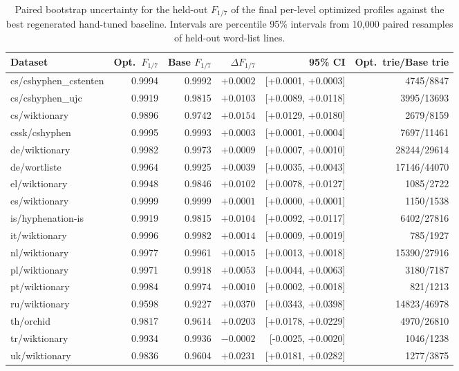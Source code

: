 \begin{table}[tb]
\centering\small
\caption{Paired bootstrap uncertainty for the held-out $F_{1/7}$ of the final per-level optimized profiles against the best regenerated hand-tuned baseline. Intervals are percentile 95\% intervals from 10{,}000 paired resamples of held-out word-list lines.}
\label{tab:final-bootstrap-ci}
\begin{tabular}{l r r r r r}
\toprule
Dataset & Opt.\ $F_{1/7}$ & Base $F_{1/7}$ & $\Delta F_{1/7}$ & 95\% CI & Opt.\ trie/Base trie \\
\midrule
cs/cshyphen\_cstenten & 0.9994 & 0.9992 & $+0.0002$ & [+0.0001, +0.0003] & 4745/8847 \\
cs/cshyphen\_ujc & 0.9919 & 0.9815 & $+0.0103$ & [+0.0089, +0.0118] & 3995/13693 \\
cs/wiktionary & 0.9896 & 0.9742 & $+0.0154$ & [+0.0129, +0.0180] & 2679/8159 \\
cssk/cshyphen & 0.9995 & 0.9993 & $+0.0003$ & [+0.0001, +0.0004] & 7697/11461 \\
de/wiktionary & 0.9982 & 0.9973 & $+0.0009$ & [+0.0007, +0.0010] & 28244/29614 \\
de/wortliste & 0.9964 & 0.9925 & $+0.0039$ & [+0.0035, +0.0043] & 17146/44070 \\
el/wiktionary & 0.9948 & 0.9846 & $+0.0102$ & [+0.0078, +0.0127] & 1085/2722 \\
es/wiktionary & 0.9999 & 0.9999 & $+0.0001$ & [+0.0000, +0.0001] & 1150/1538 \\
is/hyphenation-is & 0.9919 & 0.9815 & $+0.0104$ & [+0.0092, +0.0117] & 6402/27816 \\
it/wiktionary & 0.9996 & 0.9982 & $+0.0014$ & [+0.0009, +0.0019] & 785/1927 \\
nl/wiktionary & 0.9977 & 0.9961 & $+0.0015$ & [+0.0013, +0.0018] & 15390/27916 \\
pl/wiktionary & 0.9971 & 0.9918 & $+0.0053$ & [+0.0044, +0.0063] & 3180/7187 \\
pt/wiktionary & 0.9984 & 0.9974 & $+0.0010$ & [+0.0002, +0.0018] & 821/1213 \\
ru/wiktionary & 0.9598 & 0.9227 & $+0.0370$ & [+0.0343, +0.0398] & 14823/46978 \\
th/orchid & 0.9817 & 0.9614 & $+0.0203$ & [+0.0178, +0.0229] & 4970/26810 \\
tr/wiktionary & 0.9934 & 0.9936 & $-0.0002$ & [-0.0025, +0.0020] & 1046/1238 \\
uk/wiktionary & 0.9836 & 0.9604 & $+0.0231$ & [+0.0181, +0.0282] & 1277/3875 \\
\bottomrule
\end{tabular}
\end{table}
